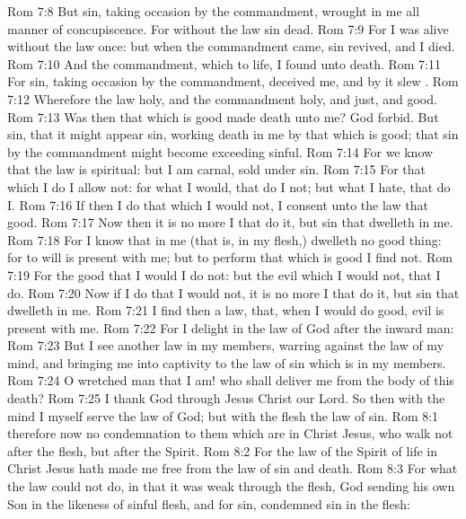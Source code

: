 \vs Rom 7:8 But sin, taking occasion by the commandment, wrought in me all manner of concupiscence. For without the law sin  dead.
\vs Rom 7:9 For I was alive without the law once: but when the commandment came, sin revived, and I died.
\vs Rom 7:10 And the commandment, which  to life, I found  unto death.
\vs Rom 7:11 For sin, taking occasion by the commandment, deceived me, and by it slew .
\vs Rom 7:12 Wherefore the law  holy, and the commandment holy, and just, and good.
\vs Rom 7:13 Was then that which is good made death unto me? God forbid. But sin, that it might appear sin, working death in me by that which is good; that sin by the commandment might become exceeding sinful.
\vs Rom 7:14 For we know that the law is spiritual: but I am carnal, sold under sin.
\vs Rom 7:15 For that which I do I allow not: for what I would, that do I not; but what I hate, that do I.
\vs Rom 7:16 If then I do that which I would not, I consent unto the law that  good.
\vs Rom 7:17 Now then it is no more I that do it, but sin that dwelleth in me.
\vs Rom 7:18 For I know that in me (that is, in my flesh,) dwelleth no good thing: for to will is present with me; but  to perform that which is good I find not.
\vs Rom 7:19 For the good that I would I do not: but the evil which I would not, that I do.
\vs Rom 7:20 Now if I do that I would not, it is no more I that do it, but sin that dwelleth in me.
\vs Rom 7:21 I find then a law, that, when I would do good, evil is present with me.
\vs Rom 7:22 For I delight in the law of God after the inward man:
\vs Rom 7:23 But I see another law in my members, warring against the law of my mind, and bringing me into captivity to the law of sin which is in my members.
\vs Rom 7:24 O wretched man that I am! who shall deliver me from the body of this death?
\vs Rom 7:25 I thank God through Jesus Christ our Lord. So then with the mind I myself serve the law of God; but with the flesh the law of sin.
\vs Rom 8:1  therefore now no condemnation to them which are in Christ Jesus, who walk not after the flesh, but after the Spirit.
\vs Rom 8:2 For the law of the Spirit of life in Christ Jesus hath made me free from the law of sin and death.
\vs Rom 8:3 For what the law could not do, in that it was weak through the flesh, God sending his own Son in the likeness of sinful flesh, and for sin, condemned sin in the flesh:

